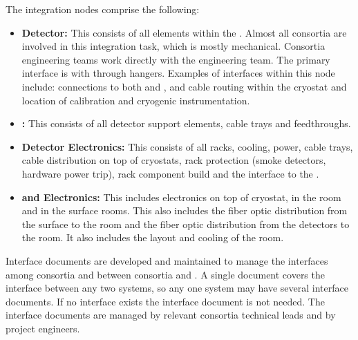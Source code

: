 The integration nodes comprise the following:
\begin{itemize}
\item {\bf Detector:} This consists of all  elements within
  the . Almost all consortia are involved in this
  integration task, which is mostly mechanical. Consortia engineering
  teams work directly with the  engineering team.  The
  primary interface is with  through hangers. Examples of
  interfaces within this node include:  connections to both
   and ,  and  cable
  routing within the cryostat and location of calibration and
  cryogenic instrumentation.
\item {\bf {}:} This consists of all detector support elements,
  cable trays and feedthroughs.
\item {\bf Detector Electronics:} This consists of all racks, cooling,
  power, cable trays, cable distribution on top of cryostats, rack
  protection (smoke detectors, hardware power trip), rack component
  build and the interface to the .
\item {\bf {} and Electronics:} This includes electronics on
  top of cryostat, in the  room and in the surface
  rooms. This also includes the fiber optic distribution from the
  surface to the  room and the fiber optic distribution
  from the detectors to the  room. It also includes the
  layout and cooling of the  room.
\end{itemize}

Interface documents are developed and maintained to manage the
interfaces among consortia and between consortia and . A
single document covers the interface between any two systems, so any
one system may have several interface documents. If no interface
exists the interface document is not needed. The
interface documents are managed by relevant consortia technical leads
and by  project engineers.

